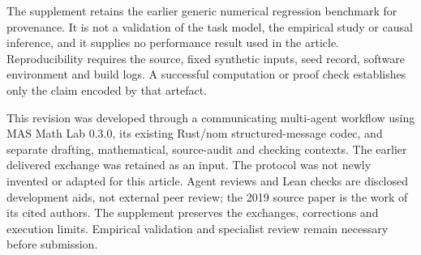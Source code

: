 \documentclass[11pt,a4paper]{amsart}
\theoremstyle{definition}
\theoremstyle{remark}
\begin{document}
The supplement retains the earlier generic numerical regression benchmark for provenance. It is not a validation of the task model, the empirical study or causal inference, and it supplies no performance result used in the article. Reproducibility requires the source, fixed synthetic inputs, seed record, software environment and build logs. A successful computation or proof check establishes only the claim encoded by that artefact.

This revision was developed through a communicating multi-agent workflow using MAS Math Lab 0.3.0, its existing Rust/nom structured-message codec, and separate drafting, mathematical, source-audit and checking contexts. The earlier delivered exchange was retained as an input. The protocol was not newly invented or adapted for this article. Agent reviews and Lean checks are disclosed development aids, not external peer review; the 2019 source paper is the work of its cited authors. The supplement preserves the exchanges, corrections and execution limits. Empirical validation and specialist review remain necessary before submission.

\clearpage


\end{document}
